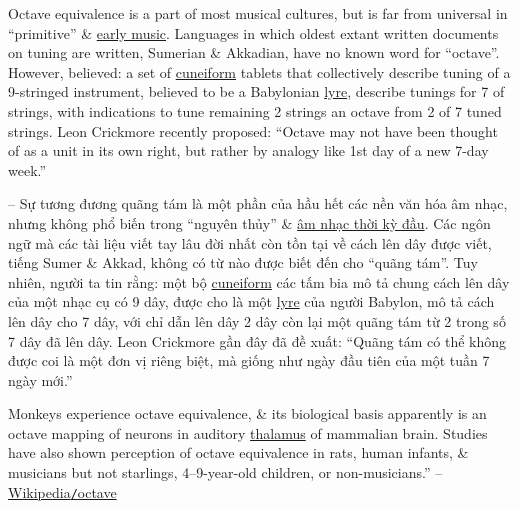 \documentclass{article}
\begin{document}
Octave equivalence is a part of most musical cultures, but is far from universal in ``primitive'' \& \href{https://en.wikipedia.org/wiki/Early_music}{early music}. Languages in which oldest extant written documents on tuning are written, Sumerian \& Akkadian, have no known word for ``octave''. However, believed: a set of \href{https://en.wikipedia.org/wiki/Cuneiform}{cuneiform} tablets that collectively describe tuning of a 9-stringed instrument, believed to be a Babylonian \href{https://en.wikipedia.org/wiki/Lyre}{lyre}, describe tunings for 7 of strings, with indications to tune remaining 2 strings an octave from 2 of 7 tuned strings. {\sc Leon Crickmore} recently proposed: ``Octave may not have been thought of as a unit in its own right, but rather by analogy like 1st day of a new 7-day week.''

-- Sự tương đương quãng tám là một phần của hầu hết các nền văn hóa âm nhạc, nhưng không phổ biến trong ``nguyên thủy'' \& \href{https://en.wikipedia.org/wiki/Early_music}{âm nhạc thời kỳ đầu}. Các ngôn ngữ mà các tài liệu viết tay lâu đời nhất còn tồn tại về cách lên dây được viết, tiếng Sumer \& Akkad, không có từ nào được biết đến cho ``quãng tám''. Tuy nhiên, người ta tin rằng: một bộ \href{https://en.wikipedia.org/wiki/Cuneiform}{cuneiform} các tấm bia mô tả chung cách lên dây của một nhạc cụ có 9 dây, được cho là một \href{https://en.wikipedia.org/wiki/Lyre}{lyre} của người Babylon, mô tả cách lên dây cho 7 dây, với chỉ dẫn lên dây 2 dây còn lại một quãng tám từ 2 trong số 7 dây đã lên dây. {\sc Leon Crickmore} gần đây đã đề xuất: ``Quãng tám có thể không được coi là một đơn vị riêng biệt, mà giống như ngày đầu tiên của một tuần 7 ngày mới.''

Monkeys experience octave equivalence, \& its biological basis apparently is an octave mapping of neurons in auditory \href{https://en.wikipedia.org/wiki/Thalamus}{thalamus} of mammalian brain. Studies have also shown perception of octave equivalence in rats, human infants, \& musicians but not starlings, 4--9-year-old children, or non-musicians.'' -- \href{https://en.wikipedia.org/wiki/Octave}{Wikipedia{\tt/}octave}

\end{document}
